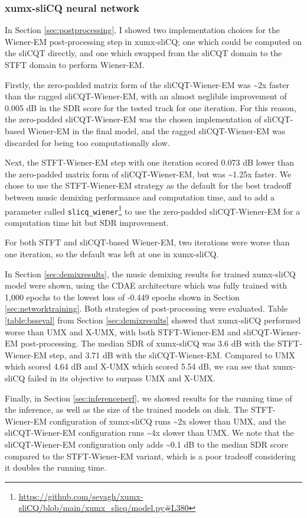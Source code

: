 \documentclass[report.tex]{subfiles}
\begin{document}
\subsubsection{xumx-sliCQ neural network}
\label{sec:netdiscuss}

In Section \ref{sec:postprocessing}, I showed two implementation choices for the Wiener-EM post-processing step in xumx-sliCQ; one which could be computed on the sliCQT directly, and one which swapped from the sliCQT domain to the STFT domain to perform Wiener-EM.

Firstly, the zero-padded matrix form of the sliCQT-Wiener-EM was \textasciitilde2x faster than the ragged sliCQT-Wiener-EM, with an almost neglibile improvement of 0.005 dB in the SDR score for the tested track for one iteration. For this reason, the zero-padded sliCQT-Wiener-EM was the chosen implementation of sliCQT-based Wiener-EM in the final model, and the ragged sliCQT-Wiener-EM was discarded for being too computationally slow.

Next, the STFT-Wiener-EM step with one iteration scored 0.073 dB lower than the zero-padded matrix form of sliCQT-Wiener-EM, but was \textasciitilde1.25x faster. We chose to use the STFT-Wiener-EM strategy as the default for the best tradeoff between music demixing performance and computation time, and to add a parameter called \Verb#slicq_wiener#\footnote{\url{https://github.com/sevagh/xumx-sliCQ/blob/main/xumx_slicq/model.py\#L380}} to use the zero-padded sliCQT-Wiener-EM for a computation time hit but SDR improvement.

For both STFT and sliCQT-based Wiener-EM, two iterations were worse than one iteration, so the default was left at one in xumx-sliCQ.

In Section \ref{sec:demixresults}, the music demixing results for trained xumx-sliCQ model were shown, using the CDAE architecture which was fully trained with 1,000 epochs to the lowest loss of -0.449 epochs shown in Section \ref{sec:networktraining}. Both strategies of post-processing were evaluated. Table \ref{table:bsseval} from Section \ref{sec:demixresults} showed that xumx-sliCQ performed worse than UMX and X-UMX, with both STFT-Wiener-EM and sliCQT-Wiener-EM post-processing. The median SDR of xumx-sliCQ was 3.6 dB with the STFT-Wiener-EM step, and 3.71 dB with the sliCQT-Wiener-EM. Compared to UMX which scored 4.64 dB and X-UMX which scored 5.54 dB, we can see that xumx-sliCQ failed in its objective to surpass UMX and X-UMX.

Finally, in Section \ref{sec:inferenceperf}, we showed results for the running time of the inference, as well as the size of the trained models on disk. The STFT-Wiener-EM configuration of xumx-sliCQ runs \textasciitilde2x slower than UMX, and the sliCQT-Wiener-EM configuration runs \textasciitilde4x slower than UMX. We note that the sliCQT-Wiener-EM configuration only adds \textasciitilde0.1 dB to the median SDR score compared to the STFT-Wiener-EM variant, which is a poor tradeoff considering it doubles the running time.
\end{document}
